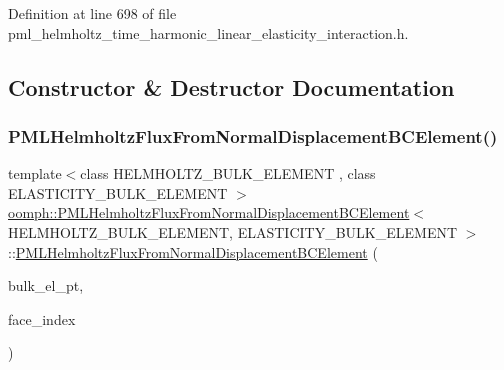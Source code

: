 Definition at line 698 of file pml\+\_\+helmholtz\+\_\+time\+\_\+harmonic\+\_\+linear\+\_\+elasticity\+\_\+interaction.\+h.



\subsection{Constructor \& Destructor Documentation}
\mbox{\label{classoomph_1_1PMLHelmholtzFluxFromNormalDisplacementBCElement_abd57422005608f9ddfccefa73e6d757c}} 
\subsubsection{\texorpdfstring{P\+M\+L\+Helmholtz\+Flux\+From\+Normal\+Displacement\+B\+C\+Element()}{PMLHelmholtzFluxFromNormalDisplacementBCElement()}\hspace{0.1cm}{\footnotesize\ttfamily [1/2]}}
{\footnotesize\ttfamily template$<$class H\+E\+L\+M\+H\+O\+L\+T\+Z\+\_\+\+B\+U\+L\+K\+\_\+\+E\+L\+E\+M\+E\+NT , class E\+L\+A\+S\+T\+I\+C\+I\+T\+Y\+\_\+\+B\+U\+L\+K\+\_\+\+E\+L\+E\+M\+E\+NT $>$ \\
\hyperlink{classoomph_1_1PMLHelmholtzFluxFromNormalDisplacementBCElement}{oomph\+::\+P\+M\+L\+Helmholtz\+Flux\+From\+Normal\+Displacement\+B\+C\+Element}$<$ H\+E\+L\+M\+H\+O\+L\+T\+Z\+\_\+\+B\+U\+L\+K\+\_\+\+E\+L\+E\+M\+E\+NT, E\+L\+A\+S\+T\+I\+C\+I\+T\+Y\+\_\+\+B\+U\+L\+K\+\_\+\+E\+L\+E\+M\+E\+NT $>$\+::\hyperlink{classoomph_1_1PMLHelmholtzFluxFromNormalDisplacementBCElement}{P\+M\+L\+Helmholtz\+Flux\+From\+Normal\+Displacement\+B\+C\+Element} (\begin{DoxyParamCaption}\item[{\hyperlink{classoomph_1_1FiniteElement}{Finite\+Element} $\ast$const \&}]{bulk\+\_\+el\+\_\+pt,  }\item[{const int \&}]{face\+\_\+index }\end{DoxyParamCaption})}



